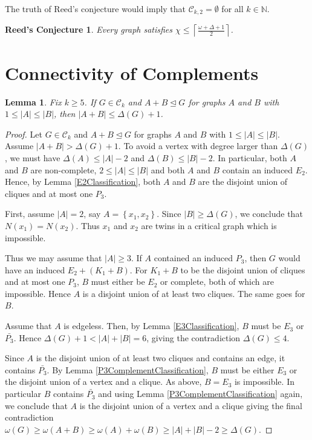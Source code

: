 \documentclass[12pt]{article}
\theoremstyle{plain}
\newtheorem{lem}[thm]{Lemma}
\newtheorem*{Reed}{Reed's Conjecture}
\theoremstyle{definition}
\theoremstyle{remark}
\newcommand{\fancy}[1]{\mathcal{#1}}
\newcommand{\C}[1]{\fancy{C}_{#1}}
\newcommand{\IN}{\mathbb{N}}
\newcommand{\set}[1]{\left\{ #1 \right\}}
\newcommand{\card}[1]{\left|#1\right|}
\newcommand{\ceil}[1]{\left\lceil#1\right\rceil}
\begin{document}
The truth of Reed's conjecture \cite{reed1998omega} would imply that $\C{k, 2} = \emptyset$ for all $k \in \IN$.

\begin{Reed}
Every graph satisfies $\chi \leq \ceil{\frac{\omega + \Delta + 1}{2}}$.
\end{Reed}

\section{Connectivity of Complements}

\begin{lem}\label{JoinSize}
Fix $k \geq 5$.  If $G \in \C{k}$ and $A + B \unlhd G$ for graphs $A$ and $B$ with $1 \leq \card{A} \leq \card{B}$, then $\card{A+B} \leq \Delta(G) + 1$.
\end{lem}
\begin{proof}
Let $G \in \C{k}$ and $A + B \unlhd G$ for graphs $A$ and $B$ with $1 \leq \card{A} \leq \card{B}$. Assume $\card{A+B} > \Delta(G) + 1$.  To avoid a vertex with degree larger than $\Delta(G)$, we must have $\Delta(A) \leq \card{A} - 2$ and $\Delta(B) \leq \card{B} - 2$.  In particular, both $A$ and $B$ are non-complete, $2 \leq \card{A} \leq \card{B}$ and both $A$ and $B$ contain an induced $E_2$.  Hence, by Lemma \ref{E2Classification}, both $A$ and $B$ are the disjoint union of cliques and at most one $P_3$.\newline

First, assume $\card{A} = 2$, say $A = \set{x_1, x_2}$.  Since $\card{B} \geq \Delta(G)$, we conclude that $N(x_1) = N(x_2)$.  Thus $x_1$ and $x_2$ are twins in a critical graph which is impossible.\newline

Thus we may assume that $\card{A} \geq 3$.   If $A$ contained an induced $P_3$, then $G$ would have an induced $E_2 + (K_1 + B)$.  For $K_1 + B$ to be the disjoint union of cliques and at most one $P_3$, $B$ must either be $E_2$ or complete, both of which are impossible.  Hence $A$ is a disjoint union of at least two cliques.  The same goes for $B$.\newline 

Assume that $A$ is edgeless.  Then, by Lemma \ref{E3Classification}, $B$ must be $E_3$ or $\bar{P_3}$.  Hence $\Delta(G) + 1 < \card{A} + \card{B} = 6$, giving the contradiction $\Delta(G) \leq 4$.\newline

Since $A$ is the disjoint union of at least two cliques and contains an edge, it contains $\bar{P_3}$.  By Lemma \ref{P3ComplementClassification}, $B$ must be either $E_3$ or the disjoint union of a vertex and a clique.  As above, $B = E_3$ is impossible.  In particular $B$ contains $\bar{P_3}$ and using Lemma \ref{P3ComplementClassification} again, we conclude that $A$ is the disjoint union of a vertex and a clique giving the final contradiction $\omega(G) \geq \omega(A+B) \geq \omega(A) + \omega(B) \geq \card{A} + \card{B} - 2 \geq \Delta(G)$.
\end{proof}
\end{document}
